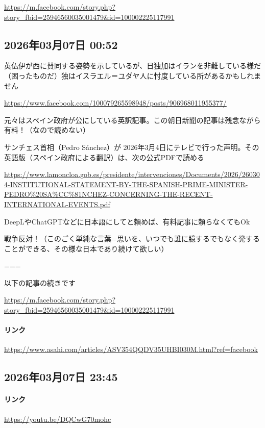 \documentclass[facebook_diary.tex]{subfiles}
\begin{document}
\url{https://m.facebook.com/story.php?story_fbid=25946560035001479&id=100002225117991}



\subsection*{2026年03月07日 00:52}

英仏伊が西に賛同する姿勢を示しているが、日独加はイランを非難している様だ（困ったものだ）独はイスラエル＝ユダヤ人に忖度している所があるかもしれません


\url{https://www.facebook.com/100079265598948/posts/906968011955377/}




元々はスペイン政府が公にしている英訳記事。この朝日新聞の記事は残念ながら有料！（なので読めない）


サンチェス首相（Pedro Sánchez）が 2026年3月4日にテレビで行った声明。その英語版（スペイン政府による翻訳）は、次の公式PDFで読める


\url{https://www.lamoncloa.gob.es/presidente/intervenciones/Documents/2026/260304-INSTITUTIONAL-STATEMENT-BY-THE-SPANISH-PRIME-MINISTER-PEDRO\%20SA\%CC\%81NCHEZ-CONCERNING-THE-RECENT-INTERNATIONAL-EVENTS.pdf}




DeepLやChatGPTなどに日本語にしてと頼めば、有料記事に頼らなくてもOk


戦争反対！（このごく単純な言葉=思いを、いつでも誰に臆するでもなく発することができる、その様な日本であり続けて欲しい）


===

以下の記事の続きです

\url{https://m.facebook.com/story.php?story_fbid=25946560035001479&id=100002225117991}



\paragraph{リンク}
\url{https://www.asahi.com/articles/ASV354QQDV35UHBI030M.html?ref=facebook}

\subsection*{2026年03月07日 23:45}

\paragraph{リンク}
\url{https://youtu.be/DQCwG70mohc}
\end{document}
